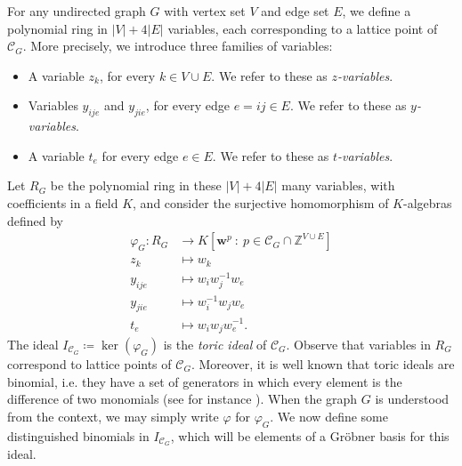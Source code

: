 For any undirected graph $G$ with vertex set $V$ and edge set $E$, we define a polynomial ring in $|V|+4|E|$ variables, each corresponding to a lattice point of $\mathcal{C}_G$. More precisely, we introduce three families of variables:
\begin{itemize}
    \item[-] A variable $z_k$, for every $k\in V\cup E$. We refer to these as \emph{$z$-variables}.
    \item[-] Variables $y_{ije}$ and $y_{jie}$, for every edge $e=ij\in E$. We refer to these as \emph{$y$-variables}. 
    \item[-] A variable $t_e$ for every edge $e\in E$. We refer to these as \emph{$t$-variables}. 
\end{itemize}
Let $R_G$ be the polynomial ring in these $|V|+4|E|$ many variables, with coefficients in a field $K$, and consider the surjective homomorphism of $K$-algebras defined by
\begin{align*}
    \varphi_G: R_G&\to K[\mathbf{w}^{p} ~ : ~ p\in \mathcal{C}_G\cap \mathbb{Z}^{V\cup E}]\\
    z_k &\mapsto w_k\\
    y_{ije} &\mapsto w_iw_j^{-1}w_{e}\\
    y_{jie} &\mapsto w_i^{-1}w_j w_{e} \\ 
    t_{e} &\mapsto w_iw_jw_{e}^{-1}.
\end{align*}
The ideal $I_{\mathcal{C}_G}\coloneqq \ker(\varphi_G)$ is the \emph{toric ideal} of $\mathcal{C}_G$. Observe that variables in $R_G$ correspond to lattice points of $\mathcal{C}_G$. Moreover, it is well known that toric ideals are binomial, i.e. they have a set of generators in which every element is the difference of two monomials (see for instance \cite[Theorem 3.2]{binomial}). 
When the graph $G$ is understood from the context, we may simply write $\varphi$ for $\varphi_G$.
We now define some distinguished binomials in $I_{\mathcal{C}_G}$, which will be elements of a Gr\"{o}bner basis for this ideal.

